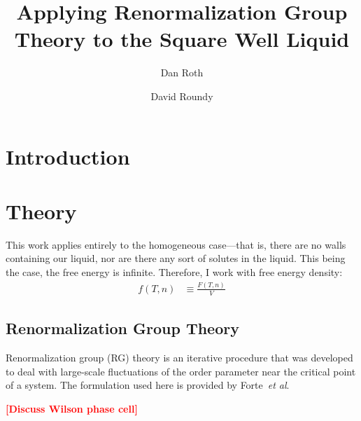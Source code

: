 \documentclass[letterpaper,twocolumn,amsmath,amssymb,prb]{revtex4-1}
\newcommand{\fixme}[1]{\textcolor{red}{\textbf{[#1]}}}
\begin{document}
\title{Applying Renormalization Group Theory to the Square Well Liquid}

\author{Dan Roth}

\author{David Roundy}

\begin{abstract}

\end{abstract}

\maketitle

\section{Introduction}

\section{Theory}\label{sec:theory}

This work applies entirely to the homogeneous case---that is, there are no walls containing our liquid, nor are there any sort of solutes in the liquid. This being the case, the free energy is infinite. Therefore, I work with free energy density:
\begin{align}
  f(T,n) &\equiv \frac{F(T,n)}{V}
\end{align}

\subsection{Renormalization Group Theory}\label{subsec:RGT}
Renormalization group (RG) theory is an iterative procedure that was
developed to deal with large-scale fluctuations of the order parameter
near the critical point of a system. The formulation used here is provided by Forte~\textit{et al}\cite{Forte11}.

\fixme{Discuss Wilson phase cell}
\end{document}
